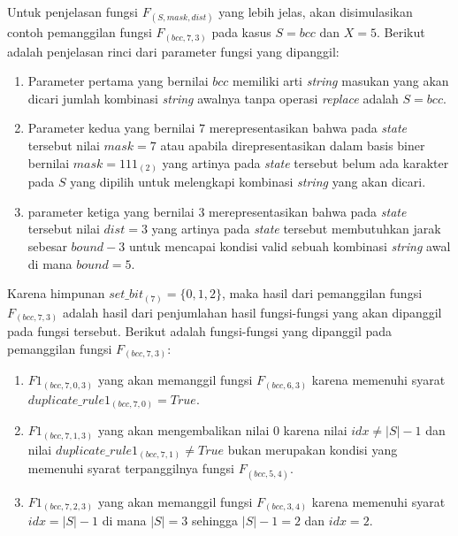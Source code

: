 Untuk penjelasan fungsi $ F_{(S, mask, dist)} $ yang lebih jelas, akan disimulasikan contoh pemanggilan fungsi $ F_{(bcc, 7, 3)} $ pada kasus $ S=bcc $ dan $ X=5 $. Berikut adalah penjelasan rinci dari parameter fungsi yang dipanggil:
\begin{enumerate}
	\item Parameter pertama yang bernilai $ bcc $ memiliki arti \textit{string} masukan yang akan dicari jumlah kombinasi \textit{string} awalnya tanpa operasi \textit{replace} adalah $ S=bcc $.
	\item Parameter kedua yang bernilai $ 7 $ merepresentasikan bahwa pada \textit{state} tersebut nilai $ mask = 7 $ atau apabila direpresentasikan dalam basis biner bernilai $ mask = 111_{(2)} $ yang artinya pada \textit{state} tersebut belum ada karakter pada $ S $ yang dipilih untuk melengkapi kombinasi \textit{string} yang akan dicari.
	\item parameter ketiga yang bernilai $ 3 $ merepresentasikan bahwa pada \textit{state} tersebut nilai $ dist = 3 $ yang artinya pada \textit{state} tersebut membutuhkan jarak sebesar $ bound - 3$ untuk mencapai kondisi valid sebuah kombinasi \textit{string} awal di mana $ bound=5 $.
\end{enumerate}

Karena himpunan $ set\_bit_{(7)} = \{0, 1, 2\} $, maka hasil dari pemanggilan fungsi $ F_{(bcc, 7, 3)} $ adalah hasil dari penjumlahan hasil fungsi-fungsi yang akan dipanggil pada fungsi tersebut. Berikut adalah fungsi-fungsi yang dipanggil pada pemanggilan fungsi $ F_{(bcc, 7, 3)} $:
\begin{enumerate}
	\item $ F1_{(bcc, 7, 0, 3)} $ yang akan memanggil fungsi $ F_{(bcc, 6, 3)} $ karena memenuhi syarat $ duplicate\_rule1_{(bcc, 7, 0)} = True$.
	\item $ F1_{(bcc, 7, 1, 3)} $ yang akan mengembalikan nilai $ 0 $ karena nilai $ idx \neq |S| - 1 $ dan nilai $ duplicate\_rule1_{(bcc, 7, 1)} \neq True$ bukan merupakan kondisi yang memenuhi syarat terpanggilnya fungsi $ F_{(bcc, 5, 4)} $.
	\item $ F1_{(bcc, 7, 2, 3)} $ yang akan memanggil fungsi $ F_{(bcc, 3, 4)} $ karena memenuhi syarat $ idx = |S| - 1 $ di mana $ |S| = 3 $ sehingga $ |S|-1 = 2 $ dan $ idx=2 $.
\end{enumerate}

